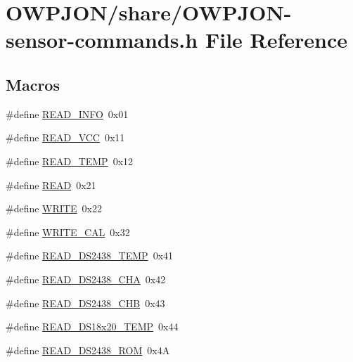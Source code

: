 \hypertarget{share_2OWPJON-sensor-commands_8h}{\section{O\-W\-P\-J\-O\-N/share/\-O\-W\-P\-J\-O\-N-\/sensor-\/commands.h File Reference}
\label{share_2OWPJON-sensor-commands_8h}
}
\subsection*{Macros}
\begin{DoxyCompactItemize}
\item 
\#define \hyperlink{share_2OWPJON-sensor-commands_8h_ae9d85efda88bdfdba5ca9fe92f557dd9}{R\-E\-A\-D\-\_\-\-I\-N\-F\-O}~0x01
\item 
\#define \hyperlink{share_2OWPJON-sensor-commands_8h_a3563b296d5f60635a1256e8a12261d74}{R\-E\-A\-D\-\_\-\-V\-C\-C}~0x11
\item 
\#define \hyperlink{share_2OWPJON-sensor-commands_8h_ac8c23082885adeec4834469b64e00bb9}{R\-E\-A\-D\-\_\-\-T\-E\-M\-P}~0x12
\item 
\#define \hyperlink{share_2OWPJON-sensor-commands_8h_ada74e7db007a68e763f20c17f2985356}{R\-E\-A\-D}~0x21
\item 
\#define \hyperlink{share_2OWPJON-sensor-commands_8h_aa10f470e996d0f51210d24f442d25e1e}{W\-R\-I\-T\-E}~0x22
\item 
\#define \hyperlink{share_2OWPJON-sensor-commands_8h_a9418b096dba157494f523dc01b82a760}{W\-R\-I\-T\-E\-\_\-\-C\-A\-L}~0x32
\item 
\#define \hyperlink{share_2OWPJON-sensor-commands_8h_a7dda9dd96643c5e273bce5f237f6c3c9}{R\-E\-A\-D\-\_\-\-D\-S2438\-\_\-\-T\-E\-M\-P}~0x41
\item 
\#define \hyperlink{share_2OWPJON-sensor-commands_8h_a63f32f386170e4065b5fdd7a1a8521cf}{R\-E\-A\-D\-\_\-\-D\-S2438\-\_\-\-C\-H\-A}~0x42
\item 
\#define \hyperlink{share_2OWPJON-sensor-commands_8h_a0cc83db22607312d835fd8da13968847}{R\-E\-A\-D\-\_\-\-D\-S2438\-\_\-\-C\-H\-B}~0x43
\item 
\#define \hyperlink{share_2OWPJON-sensor-commands_8h_a4e819c3b3fde201781ca4a9a1797c188}{R\-E\-A\-D\-\_\-\-D\-S18x20\-\_\-\-T\-E\-M\-P}~0x44
\item 
\#define \hyperlink{share_2OWPJON-sensor-commands_8h_a755ae07d8f76c19ddc3d8b1cc3a753c2}{R\-E\-A\-D\-\_\-\-D\-S2438\-\_\-\-R\-O\-M}~0x4\-A

\end{DoxyCompactItemize}
